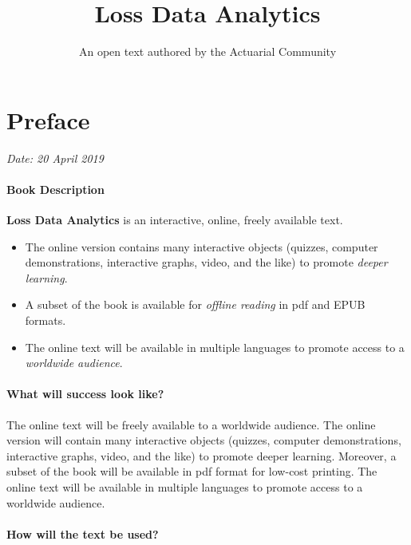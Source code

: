 \documentclass[]{book}
\title{Loss Data Analytics}
\author{An open text authored by the Actuarial Community}
\date{}
\providecommand{\tightlist}{%
  \setlength{\itemsep}{0pt}\setlength{\parskip}{0pt}}
\begin{document}
\maketitle

{
\setcounter{tocdepth}{2}
\tableofcontents
}
\chapter*{Preface}\label{preface}

\emph{Date: 20 April 2019}

\subsubsection*{Book Description}\label{book-description}

\textbf{Loss Data Analytics} is an interactive, online, freely available
text.

\begin{itemize}
\tightlist
\item
  The online version contains many interactive objects (quizzes,
  computer demonstrations, interactive graphs, video, and the like) to
  promote \emph{deeper learning}.
\item
  A subset of the book is available for \emph{offline reading} in pdf
  and EPUB formats.
\item
  The online text will be available in multiple languages to promote
  access to a \emph{worldwide audience}.
\end{itemize}

\subsubsection*{What will success look
like?}\label{what-will-success-look-like}

The online text will be freely available to a worldwide audience. The
online version will contain many interactive objects (quizzes, computer
demonstrations, interactive graphs, video, and the like) to promote
deeper learning. Moreover, a subset of the book will be available in pdf
format for low-cost printing. The online text will be available in
multiple languages to promote access to a worldwide audience.

\subsubsection*{How will the text be
used?}\label{how-will-the-text-be-used}
\end{document}
